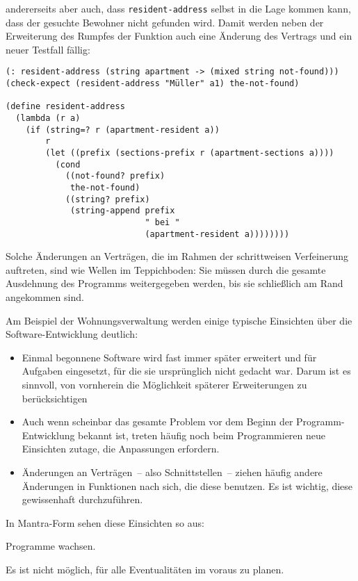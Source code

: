 andererseits aber auch, dass \texttt{resident-address} selbst in die
Lage kommen kann, dass der gesuchte Bewohner nicht gefunden wird.
Damit werden neben der Erweiterung des Rumpfes der Funktion auch eine
Änderung des Vertrags und ein neuer Testfall fällig:
%
\begin{verbatim}
(: resident-address (string apartment -> (mixed string not-found)))
(check-expect (resident-address "Müller" a1) the-not-found)

(define resident-address
  (lambda (r a)
    (if (string=? r (apartment-resident a))
        r
        (let ((prefix (sections-prefix r (apartment-sections a))))
          (cond
            ((not-found? prefix)
             the-not-found)
            ((string? prefix)
             (string-append prefix
                            " bei "
                            (apartment-resident a))))))))
\end{verbatim}
%
Solche Änderungen an Verträgen, die im Rahmen der schrittweisen
Verfeinerung auftreten, sind wie Wellen im Teppichboden:  Sie müssen
durch die gesamte Ausdehnung des Programms weitergegeben werden, bis
sie schließlich am Rand angekommen sind.

Am Beispiel der Wohnungsverwaltung werden einige typische Einsichten
über die Software-Entwicklung deutlich:
%
\begin{itemize}
\item Einmal begonnene Software wird fast immer später erweitert und
  für Aufgaben eingesetzt, für die sie ursprünglich nicht gedacht war.
  Darum ist es sinnvoll, von vornherein die Möglichkeit späterer
  Erweiterungen zu berücksichtigen
\item Auch wenn scheinbar das gesamte Problem vor dem Beginn der
  Programm-Entwicklung bekannt ist, treten häufig noch beim
  Programmieren neue Einsichten zutage, die Anpassungen erfordern.
\item Änderungen an Verträgen~-- also Schnittstellen~-- ziehen häufig
  andere Änderungen in Funktionen nach sich, die diese benutzen.   Es
  ist wichtig, diese gewissenhaft durchzuführen.
\end{itemize}

In Mantra-Form sehen diese Einsichten so aus:
%
\begin{mantra}
  Programme wachsen.
\end{mantra}

\begin{mantra}
  Es ist nicht möglich, für alle Eventualitäten im voraus zu planen.
\end{mantra}

